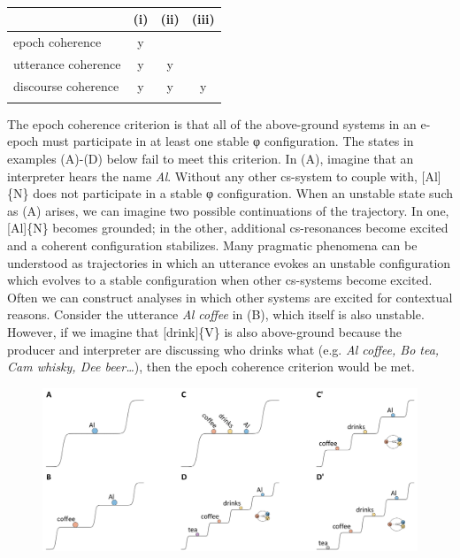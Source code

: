 \begin{table}
\begin{tabularx}{.8\textwidth}{XCCC}
\lsptoprule
& (i) & (ii) & (iii)\\
\midrule 
\raggedleft epoch coherence & y &  & \\
\raggedleft utterance coherence & y & y & \\
\raggedleft discourse coherence & y & y & y\\
\lspbottomrule
\end{tabularx}
\caption{\missingcaption}\label{tab:key:}
\end{table}
  The epoch coherence criterion is that all of the above-ground systems in an e-epoch must participate in at least one stable φ configuration. The states in examples (A)-(D) below fail to meet this criterion. In (A), imagine that an interpreter hears the name \textit{Al}. Without any other cs-system to couple with, [Al]\{N\} does not participate in a stable φ configuration. When an unstable state such as (A) arises, we can imagine two possible continuations of the trajectory. In one, [Al]\{N\} becomes grounded; in the other, additional cs-resonances become excited and a coherent configuration stabilizes. Many pragmatic phenomena can be understood as trajectories in which an utterance evokes an unstable configuration which evolves to a stable configuration when other cs-systems become excited. Often we can construct analyses in which other systems are excited for contextual reasons. Consider the utterance \textit{Al coffee} in (B), which itself is also unstable. However, if we imagine that [drink]\{V\} is also above-ground because the producer and interpreter are discussing who drinks what (e.g. \textit{Al coffee, Bo tea, Cam whisky, Dee beer…}), then the epoch coherence criterion would be met.

  
\begin{figure}
\includegraphics[width=\textwidth]{figures/Tilsen-img124.png}
\caption{\missingcaption}
\label{fig:}
\end{figure}
 

